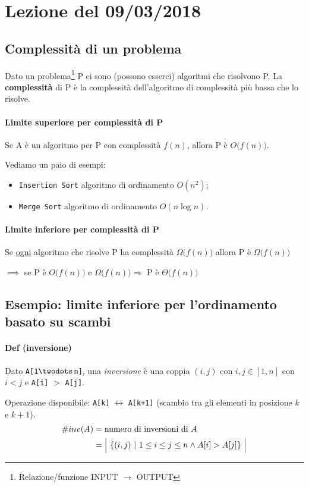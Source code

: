 \section{Lezione del 09/03/2018}

\subsection{Complessità di un problema}
Dato un problema\footnote{Relazione/funzione INPUT $\rightarrow$ OUTPUT} P ci sono
(possono esserci) algoritmi che risolvono P. La \textbf{complessità} di P è la 
complessità dell'algoritmo di complessità più bassa che lo risolve.

\paragraph{Limite superiore per complessità di P} Se A è un algoritmo per P con
complessità $f(n)$, allora P è $O \big( f(n) \big)$. \par \smallskip
Vediamo un paio di esempi:
\begin{itemize}
	\item \texttt{Insertion Sort} algoritmo di ordinamento $O(n^2)$;
	\item \texttt{Merge Sort} algoritmo di ordinamento $O(n \log n)$.
\end{itemize}

\paragraph{Limite inferiore per complessità di P}
Se \underline{ogni} algoritmo che risolve P ha complessità $\Omega \big( f(n) \big)$ allora 
P è $\Omega \big( f(n) \big)$
\bigskip

$\implies$ se P è $O \big( f(n) \big)$ e $\Omega \big( f(n) \big) \Rightarrow$ P è $\Theta \big( f(n) \big)$ 

\subsection{Esempio: limite inferiore per l'ordinamento basato su scambi}

\paragraph{Def (inversione)} Dato \texttt{A[1$\twodots$n]}, una \emph{inversione} è una coppia $(i,j)$
con $i,j \in [1,n]$ con $i < j$ e \texttt{A[i]} $>$ \texttt{A[j]}.\par \medskip
Operazione disponibile: \texttt{A[k]} $\leftrightarrow$ \texttt{A[k+1]} (scambio tra gli elementi in posizione
$k$ e $k+1$).
\begin{align*}
	\# inv(A) & = \text{numero di inversioni di } A \\
	& = \Big{\vert} \ \{ (i,j) \ \vert \ 1 \leq i \leq j \leq n \land A[i] > A[j] \} \ \Big{\vert}
\end{align*}


